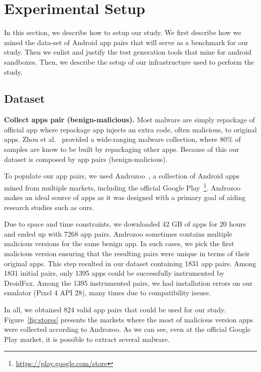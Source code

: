 \section{Experimental Setup}\label{sec:experimentalSetup}

In this section, we describe how to setup our study. We first describe how we mined the data-set of Android app pairs that will serve as a benchmark for our study. Then we enlist and justify the test generation tools that mine for android sandboxes. Then, we describe the setup of our infrastructure used to perform the study. 

\subsection{Dataset}
\textbf{Collect apps pair (benign-malicious).} Most malware are simply repackage of official app where repackage app injects an extra code, often malicious, to original apps. Zhou et al.~\cite{DBLP:conf/sp/ZhouJ12} provided a wide-ranging malware collection, where 80\% of samples are know to be built by repackaging other apps. Because of this our dataset is composed by app pairs (benign-malicious).


To populate our app pairs, we used Androzoo~\cite{DBLP:conf/msr/AllixBKT16}, a collection of Android apps mined from multiple markets, including the official Google Play~\footnote{\url{https://play.google.com/store}}. Androzoo makes an ideal source of apps as it was designed with a primary goal of aiding research studies such as ours. 

Due to space and time constraints, we downloaded 42 GB of apps for 20 hours and ended up with 7268 app pairs. Androzoo sometimes contains multiple malicious versions for the same benign app. In such cases, we pick the first malicious version ensuring that the resulting pairs were unique in terms of their original apps. This step resulted in our dataset containing 1831 app pairs. Among 1831 initial pairs, only 1395 apps could be successfully instrumented by DroidFax. Among the 1395 instrumented pairs, we had installation errors on our emulator (Pixel 4 API 28), many times due to compatibility issues. 

In all, we obtained 824 valid app pairs that could be used for our study. Figure~\ref{fig:stores} presents the markets where the most of malicious version apps were collected according to Androzoo. As we can see, even at the official Google Play market, it is possible to extract several malware.


